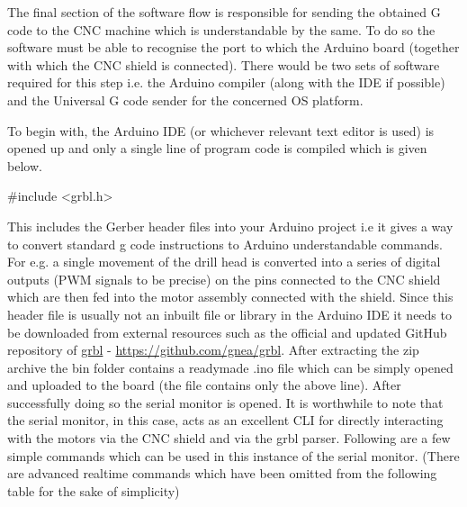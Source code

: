 The final section \cite{online_tutorial} of the software flow is responsible for sending the obtained G code to the CNC machine which is understandable by the same. To do so the software must be able to recognise the port to which the Arduino board (together with which the CNC shield is connected). There would be two sets of software required for this step i.e. the Arduino compiler (along with the IDE if possible) and the Universal G code sender for the concerned OS platform. \par

To begin with, the Arduino IDE (or whichever relevant text editor is used) is opened up and only a single line of program code is compiled which is given below.

 {\selectfont \#include <grbl.h>}

This includes the Gerber header files into your Arduino project i.e it gives a way to convert standard g code instructions to Arduino understandable commands. For e.g. a single movement of the drill head is converted into a series of digital outputs (PWM signals to be precise) on the pins connected to the CNC shield which are then fed into the motor assembly connected with the shield. Since this header file is usually not an inbuilt file or library in the Arduino IDE it needs to be downloaded from external resources such as the official and updated GitHub repository of \href{https://github.com/gnea/grbl}{grbl} - \url{https://github.com/gnea/grbl}. After extracting the zip archive the bin folder contains a readymade .ino file which can be simply opened and uploaded to the board (the file contains only the above line). After successfully doing so the serial monitor is opened. It is worthwhile to note that the serial monitor, in this case, acts as an excellent CLI for directly interacting with the motors via the CNC shield and via the grbl parser. Following are a few simple commands which can be used in this instance of the serial monitor. (There are advanced realtime commands which have been omitted from the following table for the sake of simplicity) \par


